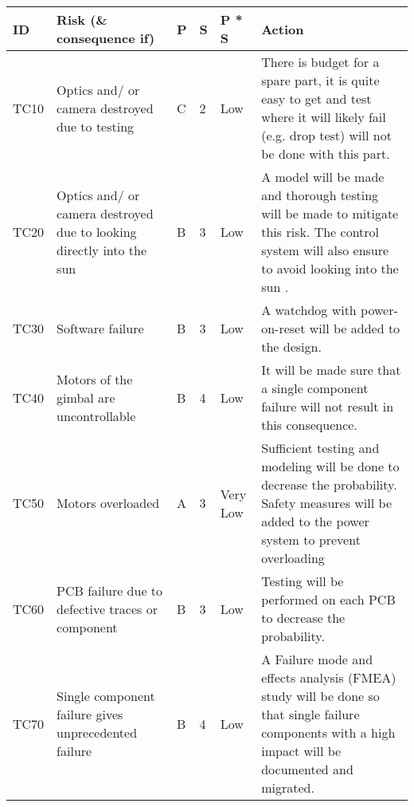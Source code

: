 

\begin{longtable}{|m{}| m{} |m{} |m{}|m{}| m{}|}

\hline
\textbf{ID} & \textbf{Risk (\& consequence if)} & \textbf{P} & \textbf{S} & \textbf{P * S} & \textbf{Action} \\ \hline


TC10 & Optics and/ or camera destroyed due to testing						& C & 2 & \cellcolor[HTML]{FCFF2F}Low 		& There is budget for a spare part, it is quite easy to get and test where it will likely fail (e.g. drop test) will not be done with this part.\\\hline

TC20 & Optics and/ or camera destroyed due to looking directly into the sun & B & 3 & \cellcolor[HTML]{FCFF2F}Low 		& A model will be made and thorough testing will be made to mitigate this risk. The control system will also ensure to avoid looking into the sun .\\\hline

TC30 & Software failure														& B & 3 & \cellcolor[HTML]{FCFF2F}Low 		& A watchdog with power-on-reset will be added to the design.\\\hline

TC40 & Motors of the gimbal are uncontrollable								& B & 4 & \cellcolor[HTML]{FCFF2F}Low 		& It will be made sure that a single component failure will not result in this consequence.\\\hline

TC50 & Motors overloaded													& A & 3 & \cellcolor[HTML]{34FF34}Very Low 	& Sufficient testing and modeling will be done to decrease the probability. Safety measures will be added to the power system to prevent overloading\\\hline

TC60 & PCB failure due to defective traces or component												& B & 3 & \cellcolor[HTML]{FCFF2F}Low 		&  Testing will be performed on each PCB to decrease the probability.\\\hline

TC70 & Single component failure gives unprecedented failure					& B & 4 & \cellcolor[HTML]{FCFF2F}Low			& A Failure mode and effects analysis (FMEA) study will be done so that single failure components with a high impact will be documented and migrated.\\\hline


\end{longtable}
